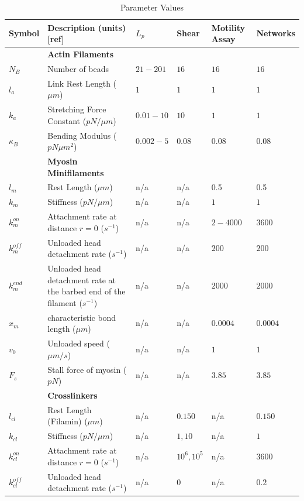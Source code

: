 \documentclass[12pt]{article}
\begin{document}
\begin{table}
  \caption{Parameter Values}
  \centering
  \begin{tabular}{|C{1cm}|L{6cm}|C{2cm}|C{2cm}|C{2cm}|C{2cm}|}
    \hline\hline
    Symbol & Description (units) [ref] & $L_p$ & Shear & Motility Assay & Networks\\
    \hline
    &\bf{Actin Filaments}& & & &\\
    \hline
    $N_B$ & Number of beads & $21-201$ & $16$ & $16$ &$16$\\
    $l_a$ & Link Rest Length ($\mu m$)\cite{odijk1983}& $1$ & $1$ &$1$& $1$\\
    $k_a$ & Stretching Force Constant ($pN/\mu m$) & $0.01-10$ & $10$ & $1$ & $1$\\
    $\kappa_B$ & Bending Modulus ($pN\mu m^2$)\cite{ott1993} & $0.002-5 $ & $0.08$ & $0.08$ & $0.08$\\
    \hline
    &\bf{Myosin Minifilaments}& & \\
    \hline
    $l_m$ & Rest Length ($\mu m$)\cite{niederman1975} & n/a & n/a & 0.5 & 0.5\\
    $k_m$ & Stiffness ($pN/\mu m$)& n/a & n/a & $1$ & $1$\\
    $k^{on}_m$ & Attachment rate at distance $r=0$ ($s^{-1}$)& n/a & n/a &$2-4000$ &$3600$\\
    $k^{off}_m$ & Unloaded head detachment rate ($s^{-1}$)& n/a & n/a & $200$ &$200$\\
    $k^{end}_m$ & Unloaded head detachment rate at the barbed end of the filament ($s^{-1}$)& n/a & n/a &$2000$ &$2000$\\
    $x_m$ & characteristic bond length ($\mu m$) \cite{stam2015}& n/a & n/a & $0.0004$& $0.0004$\\
    $v_0$ & Unloaded speed ($\mu m/s$) \cite{kron1986}&  n/a & n/a & $1$ & $1$\\
    $F_s$ & Stall force of myosin ($pN$)\cite{veigel2003}& n/a & n/a & $3.85$ & $3.85$\\
    \hline
    &\bf{Crosslinkers} & & \\
    \hline
    $l_{cl}$& Rest Length (Filamin) ($\mu m$)\cite{ferrer2008} & n/a &$0.150$ &n/a&$0.150$ \\
    $k_{cl}$ & Stiffness ($pN/\mu m$)& n/a & $1,10$ & n/a& $1$\\
    $k^{on}_{cl}$ & Attachment rate at distance $r=0$ ($s^{-1}$)& n/a & $10^6,10^5$ &n/a &$3600$\\
    $k^{off}_{cl}$ & Unloaded head detachment rate ($s^{-1}$)& n/a & 0 & n/a&$0.2$\\

\end{tabular}
\end{table}
\end{document}
